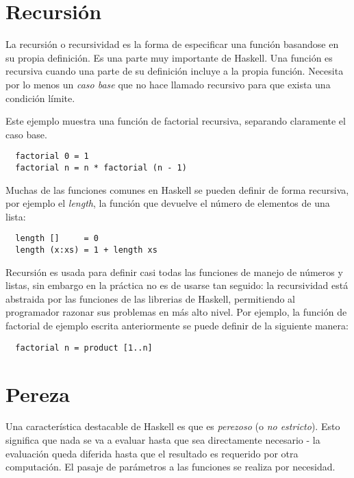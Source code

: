 \section{Recursión} %
\label{sec:recursi_n}

La recursión o recursividad es la forma de especificar una función basandose
en su propia definición. Es una parte muy importante de Haskell. Una función
es recursiva cuando una parte de su definición incluye a la propia función.
Necesita por lo menos un \textit{caso base} que no hace llamado recursivo para
que exista una condición límite.

Este ejemplo muestra una función de factorial recursiva, separando
claramente el caso base.

\begin{lstlisting}
  factorial 0 = 1
  factorial n = n * factorial (n - 1)
\end{lstlisting}

Muchas de las funciones comunes en Haskell se pueden definir de forma
recursiva, por ejemplo el \textit{length}, la función que devuelve el
número de elementos de una lista:

\begin{lstlisting}
  length []     = 0
  length (x:xs) = 1 + length xs
\end{lstlisting}

Recursión es usada para definir casi todas las funciones de manejo de números
y listas, sin embargo en la práctica no es de usarse tan seguido: la
recursividad está abstraida por las funciones de las librerias de Haskell,
permitiendo al programador razonar sus problemas en más alto nivel. Por
ejemplo, la función de factorial de ejemplo escrita anteriormente se puede
definir de la siguiente manera:

\begin{lstlisting}
  factorial n = product [1..n]
\end{lstlisting}



\section{Pereza} %
\label{sec:pereza}

Una característica destacable de Haskell es que es \textit{perezoso} (o
\textit{no estricto}). Esto significa que nada se va a evaluar hasta que sea
directamente necesario - la evaluación queda diferida hasta que el resultado
es requerido por otra computación. El pasaje de parámetros a las funciones se
realiza por necesidad.

